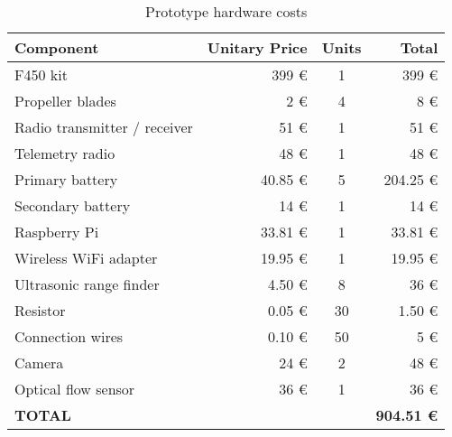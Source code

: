 
\begin{table}[htbp]
\centering
\begin{tabular}{lrcr}
	\hline
	\bfseries Component	&	\bfseries Unitary Price	&	\bfseries Units	&	\bfseries Total	\\
	\hline
	F450 kit			&	399 \euro				&	1			&	399 \euro	\\
	Propeller blades	&	2 \euro					&	4			&	8 \euro		\\
	Radio transmitter / receiver	&	51 \euro	&	1			&	51 \euro	\\
	Telemetry radio		&	48 \euro				&	1			&	48 \euro	\\
	Primary battery		&	40.85 \euro				&	5			&	204.25 \euro\\
	Secondary battery	&	14 \euro				&	1			&	14 \euro	\\
	Raspberry Pi		&	33.81 \euro				&	1			&	33.81 \euro	\\
	Wireless WiFi adapter	&	19.95 \euro			&	1			&	19.95 \euro	\\
	Ultrasonic range finder	&	4.50 \euro			&	8			&	36 \euro	\\
	Resistor			&	0.05 \euro				&	30			&	1.50 \euro	\\
	Connection wires	&	0.10 \euro				&	50			&	5 \euro		\\
	Camera				&	24 \euro				&	2			&	48 \euro	\\
	Optical flow sensor	&	36 \euro				&	1			&	36 \euro	\\
	\hline
	\bfseries TOTAL		&	&	&	\bfseries 904.51 \euro\\
	\hline
\end{tabular}
\caption{Prototype hardware costs}
\label{tab:budget}
\end{table}
